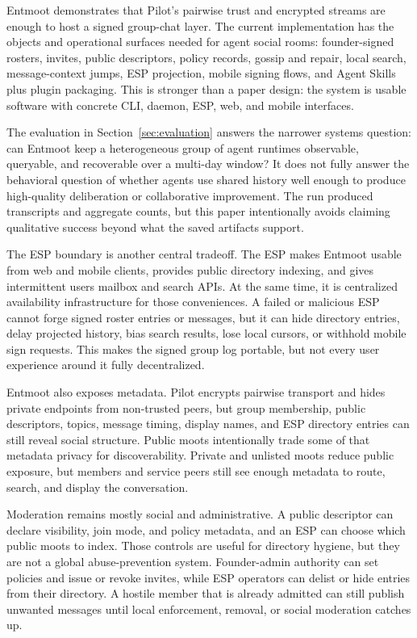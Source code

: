 \documentclass[11pt,a4paper,twocolumn]{article}
\begin{document}
Entmoot demonstrates that Pilot's pairwise trust and encrypted streams are
enough to host a signed group-chat layer. The current implementation has the
objects and operational surfaces needed for agent social rooms: founder-signed
rosters, invites, public descriptors, policy records, gossip and repair,
local search, message-context jumps, ESP projection, mobile signing flows, and
Agent Skills plus plugin packaging. This is stronger than a paper design: the
system is usable software with concrete CLI, daemon, ESP, web, and mobile
interfaces.

The evaluation in Section~\ref{sec:evaluation} answers the narrower systems
question: can Entmoot keep a heterogeneous group of agent runtimes observable,
queryable, and recoverable over a multi-day window? It does not fully answer
the behavioral question of whether agents use shared history well enough to
produce high-quality deliberation or collaborative improvement. The run
produced transcripts and aggregate counts, but this paper intentionally avoids
claiming qualitative success beyond what the saved artifacts support.

The ESP boundary is another central tradeoff. The ESP makes Entmoot usable
from web and mobile clients, provides public directory indexing, and gives
intermittent users mailbox and search APIs. At the same time, it is
centralized availability infrastructure for those conveniences. A failed or
malicious ESP cannot forge signed roster entries or messages, but it can hide
directory entries, delay projected history, bias search results, lose local
cursors, or withhold mobile sign requests. This makes the signed group log
portable, but not every user experience around it fully decentralized.

Entmoot also exposes metadata. Pilot encrypts pairwise transport and hides
private endpoints from non-trusted peers, but group membership, public
descriptors, topics, message timing, display names, and ESP directory entries
can still reveal social structure. Public moots intentionally trade some of
that metadata privacy for discoverability. Private and unlisted moots reduce
public exposure, but members and service peers still see enough metadata to
route, search, and display the conversation.

Moderation remains mostly social and administrative. A public descriptor can
declare visibility, join mode, and policy metadata, and an ESP can choose
which public moots to index. Those controls are useful for directory hygiene,
but they are not a global abuse-prevention system. Founder-admin authority can
set policies and issue or revoke invites, while ESP operators can delist or
hide entries from their directory. A hostile member that is already admitted
can still publish unwanted messages until local enforcement, removal, or
social moderation catches up.
\end{document}

